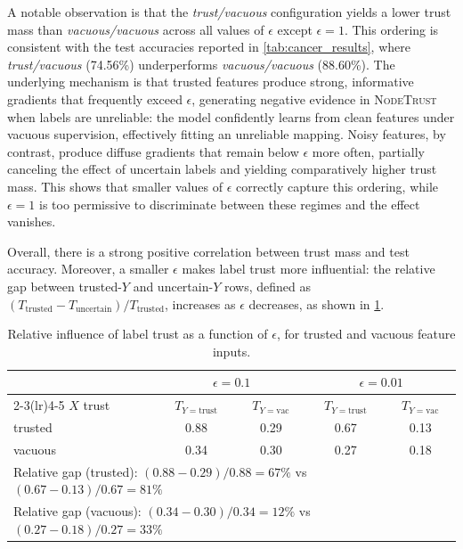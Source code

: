 A notable observation is that the \textit{trust/vacuous} configuration yields a lower trust mass than \textit{vacuous/vacuous} across all values of $\epsilon$ except $\epsilon = 1$. This ordering is consistent with the test accuracies reported in \cref{tab:cancer_results}, where \textit{trust/vacuous} (74.56\%) underperforms \textit{vacuous/vacuous} (88.60\%). The underlying mechanism is that trusted features produce strong, informative gradients that frequently exceed $\epsilon$, generating negative evidence in \textsc{NodeTrust} when labels are unreliable: the model confidently learns from clean features under vacuous supervision, effectively fitting an unreliable mapping. Noisy features, by contrast, produce diffuse gradients that remain below $\epsilon$ more often, partially canceling the effect of uncertain labels and yielding comparatively higher trust mass. This shows that smaller values of $\epsilon$ correctly capture this ordering, while $\epsilon = 1$ is too permissive to discriminate between these regimes and the effect vanishes.

Overall, there is a strong positive correlation between trust mass and test accuracy. Moreover, a smaller $\epsilon$ makes label trust more influential: the relative gap between trusted-$Y$ and uncertain-$Y$ rows, defined as $(T_{\text{trusted}} - T_{\text{uncertain}}) / T_{\text{trusted}}$,
increases as $\epsilon$ decreases, as shown in \cref{tab:epsilon_gap}.
\begin{table}[h]
\centering
\caption{Relative influence of label trust as a function of $\epsilon$,
for trusted and vacuous feature inputs.}
\label{tab:epsilon_gap}

\begin{tabular}{lcccc}
\hline
 & \multicolumn{2}{c}{$\epsilon = 0.1$} & \multicolumn{2}{c}{$\epsilon = 0.01$} \\
\cmidrule(lr){2-3}\cmidrule(lr){4-5}
$X$ trust & $T_{Y=\text{trust}}$ & $T_{Y=\text{vac}}$ & $T_{Y=\text{trust}}$ & $T_{Y=\text{vac}}$ \\
\hline
trusted  & 0.88 & 0.29 & 0.67 & 0.13 \\
vacuous  & 0.34 & 0.30 & 0.27 & 0.18 \\
\hline
\multicolumn{5}{l}{\small Relative gap (trusted): $(0.88-0.29)/0.88 = 67\%$ vs $(0.67-0.13)/0.67 = 81\%$} \\
\multicolumn{5}{l}{\small Relative gap (vacuous): $(0.34-0.30)/0.34 = 12\%$ vs $(0.27-0.18)/0.27 = 33\%$} \\
\hline
\end{tabular}
\end{table}


